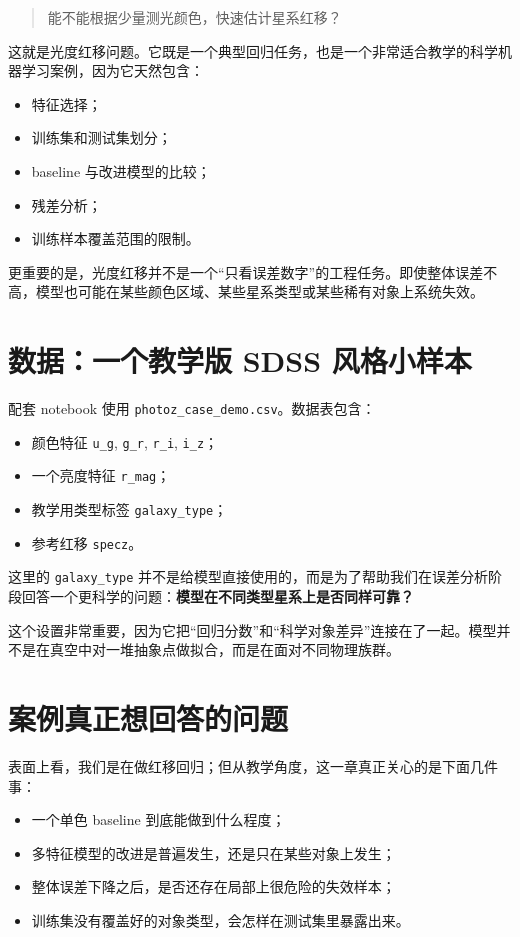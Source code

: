 \begin{quote}
能不能根据少量测光颜色，快速估计星系红移？
\end{quote}

这就是光度红移问题。它既是一个典型回归任务，也是一个非常适合教学的科学机器学习案例，因为它天然包含：

\begin{itemize}
    \item 特征选择；
    \item 训练集和测试集划分；
    \item baseline 与改进模型的比较；
    \item 残差分析；
    \item 训练样本覆盖范围的限制。
\end{itemize}

更重要的是，光度红移并不是一个“只看误差数字”的工程任务。即使整体误差不高，模型也可能在某些颜色区域、某些星系类型或某些稀有对象上系统失效。

\section{数据：一个教学版 SDSS 风格小样本}

配套 notebook 使用 \nolinkurl{photoz_case_demo.csv}。数据表包含：

\begin{itemize}
    \item 颜色特征 \texttt{u\_g}, \texttt{g\_r}, \texttt{r\_i}, \texttt{i\_z}；
    \item 一个亮度特征 \texttt{r\_mag}；
    \item 教学用类型标签 \texttt{galaxy\_type}；
    \item 参考红移 \texttt{specz}。
\end{itemize}

这里的 \texttt{galaxy\_type} 并不是给模型直接使用的，而是为了帮助我们在误差分析阶段回答一个更科学的问题：\textbf{模型在不同类型星系上是否同样可靠？}

这个设置非常重要，因为它把“回归分数”和“科学对象差异”连接在了一起。模型并不是在真空中对一堆抽象点做拟合，而是在面对不同物理族群。

\section{案例真正想回答的问题}

表面上看，我们是在做红移回归；但从教学角度，这一章真正关心的是下面几件事：

\begin{itemize}
    \item 一个单色 baseline 到底能做到什么程度；
    \item 多特征模型的改进是普遍发生，还是只在某些对象上发生；
    \item 整体误差下降之后，是否还存在局部上很危险的失效样本；
    \item 训练集没有覆盖好的对象类型，会怎样在测试集里暴露出来。
\end{itemize}

